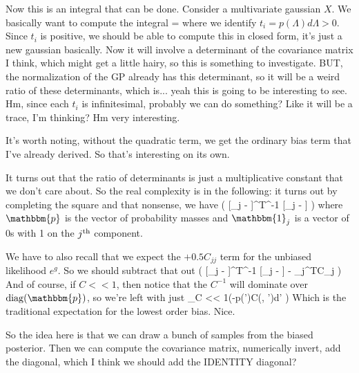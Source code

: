 Now this is an integral that can be done. Consider a multivariate gaussian $X$. We basically want to compute the integral
\beq
{} = 
\eeq
where we identify $t_i = p(\Lambda)d\Lambda > 0$. Since $t_i$ is positive, we should be able to compute this in closed form, it's just a new gaussian basically. Now it will involve a determinant of the covariance matrix I think, which might get a little hairy, so this is something to investigate. BUT, the normalization of the GP already has this determinant, so it will be a weird ratio of these determinants, which is... yeah this is going to be interesting to see. Hm, since each $t_i$ is infinitesimal, probably we can do something? Like it will be a trace, I'm thinking? Hm very interesting.


It's worth noting, without the quadratic term, we get the ordinary bias term that I've already derived. So that's interesting on its own.

It turns out that the ratio of determinants is just a multiplicative constant that we don't care about. So the real complexity is in the following: it turns out by completing the square and that nonsense, we have
\beq
\propto \exp\left(
[_j - ]^T^{-1}
[_j - ]
\right)
\eeq
where $\mathbbm{p}$ is the vector of probability masses and $\mathbbm{1}_j$ is a vector of 0s with 1 on the $j^{\rm th}$ component.

We have to also recall that we expect the $+0.5 C_{jj}$ term for the unbiased likelihood $e^g$. So we should subtract that out
\beq
\propto \exp\left(
[_j - ]^T^{-1}
[_j - ] - _j^TC_j
\right)
\eeq
And of course, if $C << 1$, then notice that the $C^{-1}$ will dominate over ${\rm diag}(\mathbbm{p})$, so we're left with just
\beq
\lim_{C << 1}\to \propto \exp\left(-\int p(\Lambda')C(\Lambda, \Lambda')d\Lambda'
\right)
\eeq
Which is the traditional expectation for the lowest order bias. Nice.

So the idea here is that we can draw a bunch of samples from the biased posterior. Then we can compute the covariance matrix, numerically invert, add the diagonal, which I think we should add the IDENTITY diagonal?

